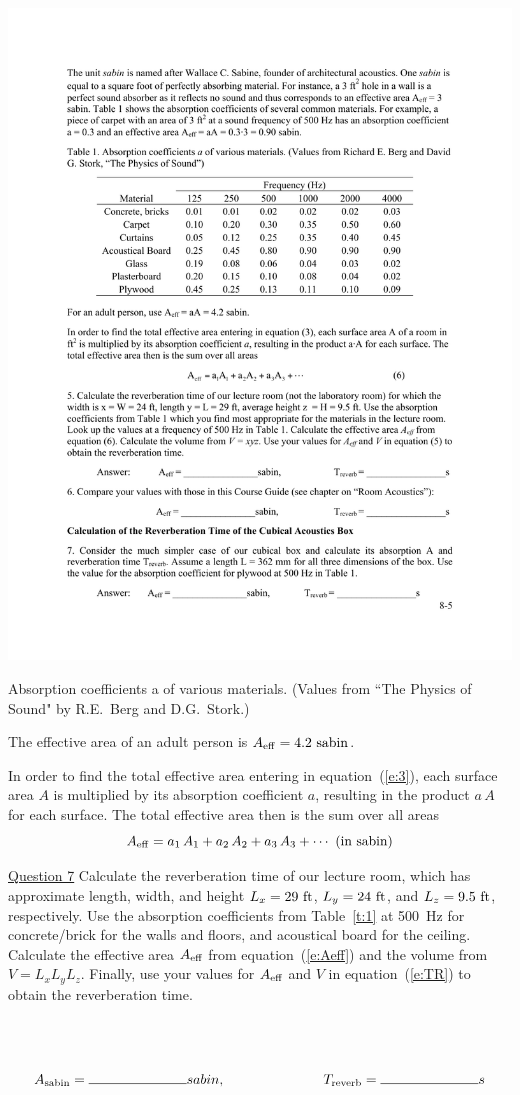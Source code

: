\documentclass[11pt]{NSF}
\def\be{\begin{equation}}
\def\ee{\end{equation}}
\begin{document}
%
\begin{table}[hbtp]
\begin{center}
\includegraphics[width=.8\textwidth]{tab8_1}
\caption{Absorption coefficients a of various materials. 
(Values from ``The Physics of Sound" by R.E.~Berg and D.G.~Stork.)}
\label{t:1}
\end{center}
\end{table}
%
The effective area of an adult person is $A_{\rm eff} = 4.2~{\rm sabin}$.

In order to find the total effective area entering in
equation~(\ref{e:3}), each surface area $A$ is multiplied by 
its absorption coefficient $a$, resulting in the
product $a\, A$ for each surface. 
The total effective area then is the sum over all areas
%
\be
A_{\rm eff} = a_1\,A_1 + a_2\,A_2 + a_3\,A_3 + \cdots
~(\textrm{in sabin})
\label{e:Aeff}
\ee

\underline{Question 7} Calculate the reverberation time of our lecture room, which has
approximate
length, width, and height $L_x=29~{\rm ft}$, $L_y=24~{\rm ft}$, and 
$L_z=9.5~{\rm ft}$, respectively.
Use the absorption coefficients from Table~\ref{t:1} at 500~Hz
for concrete/brick for the walls and floors, and acoustical board
for the ceiling.
Calculate the effective area $A_{\rm eff}$ from
equation~(\ref{e:Aeff}) and the volume from $V = L_xL_yL_z$. 
Finally, use your values for $A_{\rm eff}$ and $V$ in
equation~(\ref{e:TR}) to
obtain the reverberation time.
\\
\\
\\
\\
\[A_{\rm sabin} = \rule{2.5cm}{0.15mm}sabin, \rule{2.5cm}{0.0mm} T_{\rm reverb} = \rule{2.5cm}{0.15mm}s\]
\end{document}
